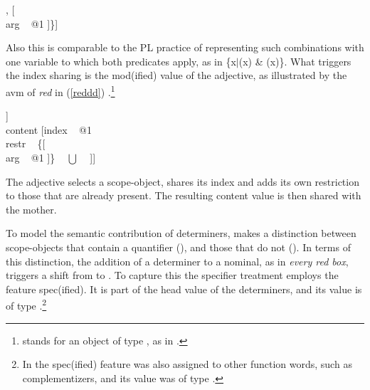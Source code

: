 \documentclass[output=paper]{langsci/langscibook}
\begin{document}
\begin{exe} 
\ex\label{redbox} 
\begin{avm}
[\type{scope-obj}         \\
 index ~ @1                \\
 restr ~ \{ [\type{red}   \\
             arg ~ @1 ] ,
            [   \\
             arg ~ @1 ]\}]
\end{avm}
\end{exe}

\noindent
Also this is comparable to the PL practice of representing such 
combinations with one variable to which both predicates apply, as in 
\{x$|$(x) \& (x)\}. What triggers the index sharing is 
the {\sc mod(ified)} value of the adjective, as illustrated by the {\sc avm} of 
\emph{red} in (\ref{reddd}) \citep[55]{ps2}.\footnote{\avmbox{$\Sigma$} 
stands for an object of type , as in \citet{GS00}.} 

\begin{exe} 
\ex\label{reddd}
\begin{avm}
[cat|head [\type{adjective}                               \\
           mod|loc|content [\type{scope-obj}            \\
                            index ~ @1                   \\
                            restr ~ \avmbox{$\Sigma$} ]] \\
 content [index ~ @1                                     \\
          restr ~ \{[                         \\
                     arg ~ @1 ]\} ~ $\bigcup$ ~ \avmbox{$\Sigma$} ]]
\end{avm}
\end{exe}

\noindent
The adjective selects a scope-object, shares its index and adds its own 
restriction to those that are already present. The resulting {\sc content} 
value is then shared with the mother.

To model the semantic contribution of determiners, \citet{GS00} 
makes a distinction between scope-objects that contain a quantifier 
(), and those that do not (). 
In terms of this distinction, the 
addition of a determiner to a nominal, as in \emph{every red box}, 
triggers a shift from  to . 
To capture this the specifier treatment employs the feature {\sc spec(ified)}. 
It is part of the {\sc head} value of the determiners, and its value is of type 
.\footnote{In \citet[45]{ps2} the {\sc spec(ified)}
feature was also assigned to other function words, such as complementizers, 
and its value was of type .}   
\end{document}

